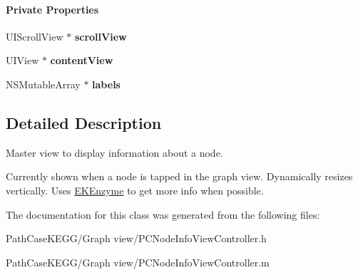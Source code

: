\begin{Indent}\paragraph*{Private Properties}
\begin{DoxyCompactItemize}
\item 
\hypertarget{interface_p_c_node_info_view_controller_a1475446790ccfd7913ad4411b765fcea}{
UIScrollView $\ast$ {\bfseries scrollView}}
\label{interface_p_c_node_info_view_controller_a1475446790ccfd7913ad4411b765fcea}

\item 
\hypertarget{interface_p_c_node_info_view_controller_aa6e8acae9c46e40548b7b1c794b10455}{
UIView $\ast$ {\bfseries contentView}}
\label{interface_p_c_node_info_view_controller_aa6e8acae9c46e40548b7b1c794b10455}

\item 
\hypertarget{interface_p_c_node_info_view_controller_ad890e9dbf0b63c8cf8987116bd6c5a4e}{
NSMutableArray $\ast$ {\bfseries labels}}
\label{interface_p_c_node_info_view_controller_ad890e9dbf0b63c8cf8987116bd6c5a4e}

\end{DoxyCompactItemize}
\end{Indent}


\subsection{Detailed Description}
Master view to display information about a node. 

Currently shown when a node is tapped in the graph view. Dynamically resizes vertically. Uses \hyperlink{interface_e_k_enzyme}{EKEnzyme} to get more info when possible. 

The documentation for this class was generated from the following files:\begin{DoxyCompactItemize}
\item 
PathCaseKEGG/Graph view/PCNodeInfoViewController.h\item 
PathCaseKEGG/Graph view/PCNodeInfoViewController.m\end{DoxyCompactItemize}
